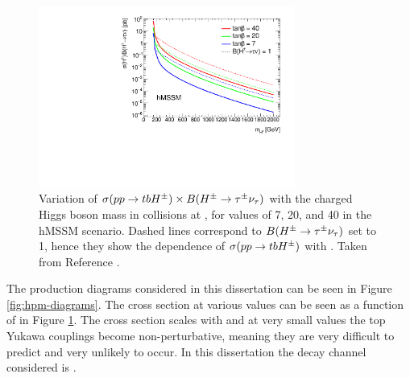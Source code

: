	\begin{figure}[!ht]
		\centering
		\includegraphics[width=0.75\textwidth]{chapters/chapter2_theory/images/XSBR_hmssm.pdf}
		\caption{\label{fig:hpm-xsec} Variation of $\sigma(pp \to tbH^{\pm}) \times B(H^{\pm} \to \tau^{\pm} \nu_{\tau})$ with the charged Higgs boson mass in \pp collisions at \sqs, for \tanb values of 7, 20, and 40 in the hMSSM scenario. Dashed lines correspond to $B(H^{\pm} \to \tau^{\pm} \nu_{\tau})$ set to 1, hence they show the dependence of $\sigma(pp \to tbH^{\pm})$ with \mHpm. Taken from Reference \cite{hpm-previous}.}
	\end{figure}
	The production diagrams considered in this dissertation can be seen in Figure \ref{fig:hpm-diagrams}. The cross section at various \tanb values can be seen as a function of \mHpm in Figure \ref{fig:hpm-xsec}. The cross section scales with \tanb and at very small values the top Yukawa couplings become non-perturbative, meaning they are very difficult to predict and very unlikely to occur. In this dissertation the decay channel considered is \HpmLong. 
